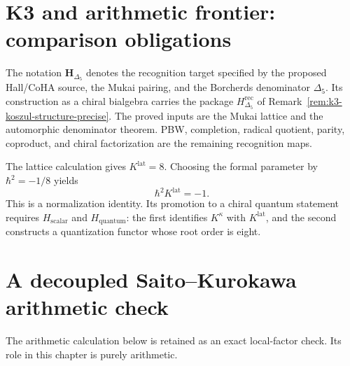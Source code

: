 \section{K3 and arithmetic frontier: comparison obligations}
\label{sec:cclimax-supplement}

\begin{remark}
\label{rem:cclimax-1}
\ClaimStatusOpen
The notation \(\mathbf H_{\Delta_5}\) denotes the recognition target
specified by the proposed Hall/CoHA source, the Mukai pairing, and the
Borcherds denominator \(\Delta_5\).  Its construction as a chiral
bialgebra carries the package
\(H_{\Delta_5}^{\mathrm{rec}}\) of
Remark~\ref{rem:k3-koszul-structure-precise}.  The proved inputs are
the Mukai lattice and the automorphic denominator theorem.  PBW,
completion, radical quotient, parity, coproduct, and chiral
factorization are the remaining recognition maps.
\end{remark}

\begin{remark}
\label{rem:cclimax-2}
The lattice calculation gives \(K^{\mathrm{lat}}=8\).  Choosing the
formal parameter by \(\hbar^2=-1/8\) yields
\[
 \hbar^2K^{\mathrm{lat}}=-1.
\]
This is a normalization identity.  Its promotion to a chiral quantum
statement requires \(H_{\mathrm{scalar}}\) and
\(H_{\mathrm{quantum}}\): the first identifies
\(K^\kappa\) with \(K^{\mathrm{lat}}\), and the second constructs a
quantization functor whose root order is eight.
\end{remark}

\section{A decoupled Saito--Kurokawa arithmetic check}
\label{sec:cclimax-supplement-ii}

The arithmetic calculation below is retained as an exact local-factor
check.  Its role in this chapter is purely arithmetic.


